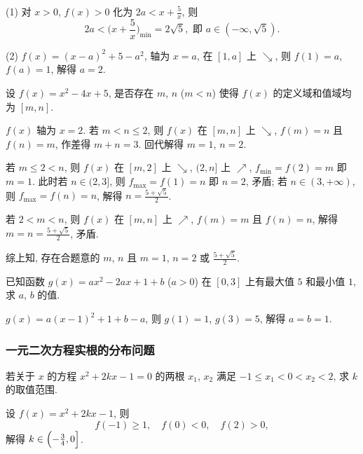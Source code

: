   \beginsolution
    (1) 对 $x>0$, $f(x)>0$ 化为 $2a<x+\frac5x$, 则
    \[2a<\Big(x+\frac5x)_{\min}=2\sqrt5,\text{\ 即\ }
      a\in(-\infty,\sqrt5).\]
    
    (2) $f(x)=(x-a)^2+5-a^2$, 轴为 $x=a$, 在 $[1,a]$ 上 $\searrow$, 则 $f(1)=a$, $f(a)=1$, 解得 $a=2$.
    
    \varexercise 设  $f(x)=x^2-4x+5$, 是否存在 $m$, $n$ ($m<n$) 使得 $f(x)$ 的定义域和值域均为 $[m,n]$.
    
    $f(x)$ 轴为 $x=2$. 若 $m<n\leqslant 2$, 则 $f(x)$ 在 $[m,n]$ 上 $\searrow$, $f(m)=n$ 且 $f(n)=m$, 作差得 $m+n=3$. 回代解得 $m=1$, $n=2$.
    
    若 $m\leqslant 2< n$, 则 $f(x)$ 在 $[m,2]$ 上 $\searrow$, $(2,n]$ 上 $\nearrow$, $f_{\min}=f(2)=m$ 即 $m=1$. 此时若 $n\in(2,3]$, 则 $f_{\max}=f(1)=n$ 即 $n=2$, 矛盾; 若 $n\in(3,+\infty)$, 则 $f_{\max}=f(n)=n$, 解得 $n=\frac{5+\sqrt5}2$.
    
    若 $2<m<n$, 则 $f(x)$ 在 $[m,n]$ 上 $\nearrow$, $f(m)=m$ 且 $f(n)=n$, 解得 $m=n=\frac{5+\sqrt5}2$, 矛盾.
    
    综上知, 存在合题意的 $m$, $n$ 且 $m=1$, $n=2$ 或 $\frac{5+\sqrt5}2$.
  \endsolution
  
  \lianxi
  \begin{exercise}[s]
    已知函数 $g(x)=ax^2 -2ax+1+b$ ($a>0$) 在 $[0,3]$ 
    上有最大值 $5$ 和最小值 $1$, 求 $a$, $b$ 的值.
  \end{exercise}

  \beginsolution
    $g(x)=a(x-1)^2+1+b-a$, 则 $g(1)=1$, $g(3)=5$, 解得 $a=b=1$.
  \endsolution
  
  \subsubsection{一元二次方程实根的分布问题}
  \begin{example}
    若关于 $x$ 的方程 $x^2 +2kx-1=0$ 的两根 $x_1$, $x_2$ 
    满足 $-1\leqslant x_1 <0<x_2 <2$, 求 $k$ 的取值范围.
  \end{example}

  \beginsolution
    设 $f(x)=x^2+2kx-1$, 则
    \[f(-1)\geqslant 1,\quad f(0)<0,\quad f(2)>0,\]
    解得 $k\in\Bigl(-\frac34,0\Bigr]$.
  \endsolution
  

